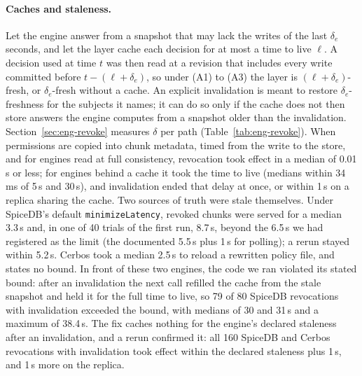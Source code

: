 \paragraph{Caches and staleness.}
Let the engine answer from a snapshot that may lack the writes of the last $\delta_e$ seconds, and let
the layer cache each decision for at most a time to live $\ell$. A decision used at time $t$ was then
read at a revision that includes every write committed before $t - (\ell + \delta_e)$, so under (A1)
to (A3) the layer is $(\ell + \delta_e)$-fresh, or $\delta_e$-fresh without a cache. An explicit
invalidation is meant to restore $\delta_e$-freshness for the subjects it names; it can do so only if
the cache does not then store answers the engine computes from a snapshot older than the
invalidation. Section~\ref{sec:eng-revoke} measures $\delta$ per path (Table~\ref{tab:eng-revoke}).
When permissions are copied into chunk metadata, timed from the write to the store, and for engines read at full consistency, revocation
took effect in a median of 0.01\,s or less; for engines behind a cache it took the time to live
(medians within 34\,ms of 5\,s and 30\,s), and invalidation ended that delay at once, or within 1\,s
on a replica sharing the cache. Two sources of truth were stale themselves. Under SpiceDB's default
\texttt{minimizeLatency}, revoked chunks were served for a median 3.3\,s and, in one of 40 trials of
the first run, 8.7\,s, beyond the 6.5\,s we had registered as the limit (the documented 5.5\,s plus
1\,s for polling); a rerun stayed within 5.2\,s. Cerbos took a median 2.5\,s to reload a rewritten policy file, and
states no bound. In front of these two engines, the code we ran violated its stated bound:
after an invalidation the next call refilled the cache from the stale snapshot and held it for the
full time to live, so 79 of 80 SpiceDB revocations with invalidation exceeded the bound, with medians
of 30 and 31\,s and a maximum of 38.4\,s. The fix caches nothing for the engine's declared staleness after an invalidation, and
a rerun confirmed it: all 160 SpiceDB and Cerbos revocations with invalidation took effect within the
declared staleness plus 1\,s, and 1\,s more on the replica.

